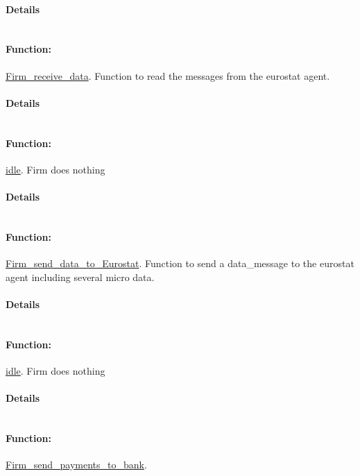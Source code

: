\documentclass[a4paper,11pt]{article}
\begin{document}
\paragraph{Details}
\begin{verbatim}
\end{verbatim}
\paragraph{Function:}\url{Firm_receive_data}.
Function to read the messages from the eurostat agent.
\paragraph{Details}
\begin{verbatim}
\end{verbatim}
\paragraph{Function:}\url{idle}.
Firm does nothing
\paragraph{Details}
\begin{verbatim}
\end{verbatim}
\paragraph{Function:}\url{Firm_send_data_to_Eurostat}.
Function to send a data\_message to the eurostat agent including several micro data.
\paragraph{Details}
\begin{verbatim}
\end{verbatim}
\paragraph{Function:}\url{idle}.
Firm does nothing
\paragraph{Details}
\begin{verbatim}
\end{verbatim}
\paragraph{Function:}\url{Firm_send_payments_to_bank}.
\end{document}
